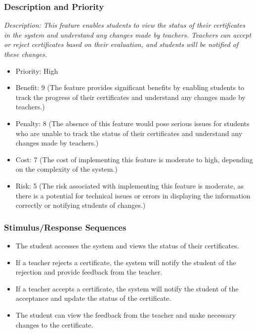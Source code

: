 \documentclass{article}
\begin{document}
\subsubsection{Description and Priority}
\emph{Description: This feature enables students to view the status of their certificates in the system and understand any changes made by teachers. Teachers can accept or reject certificates based on their evaluation, and students will be notified of these changes.}
\begin{itemize}
  \item Priority: High
  \item Benefit: 9 (The feature provides significant benefits by enabling students to track the progress of their certificates and understand any changes made by teachers.)
  \item Penalty: 8 (The absence of this feature would pose serious issues for students who are unable to track the status of their certificates and understand any changes made by teachers.)
  \item Cost: 7 (The cost of implementing this feature is moderate to high, depending on the complexity of the system.)
  \item Risk: 5 (The risk associated with implementing this feature is moderate, as there is a potential for technical issues or errors in displaying the information correctly or notifying students of changes.)
\end{itemize}

\subsubsection{Stimulus/Response Sequences}
\begin{itemize}
  \item The student accesses the system and views the status of their certificates.
  \item If a teacher rejects a certificate, the system will notify the student of the rejection and provide feedback from the teacher.
  \item If a teacher accepts a certificate, the system will notify the student of the acceptance and update the status of the certificate.
  \item The student can view the feedback from the teacher and make necessary changes to the certificate.
\end{itemize}
\end{document}
